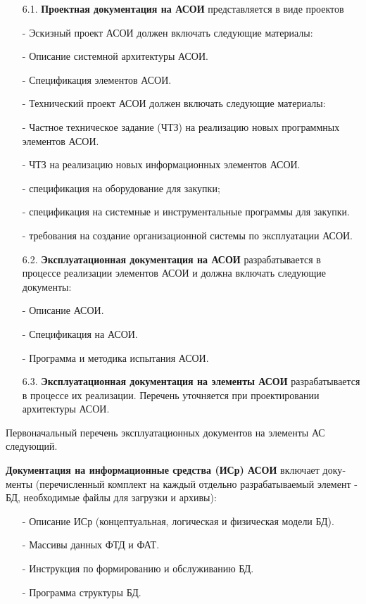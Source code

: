\documentclass[12pt, a4paper, simple]{eskdtext}
\begin{document}
    \begin{enumerate}
        \item[6.1.] \textbf{Проектная документация на АСОИ} представляется в виде проектов
        \item[-] Эскизный проект АСОИ должен включать следующие материалы:
        \item[-] Описание системной архитектуры АСОИ.
        \item[-] Спецификация элементов АСОИ.
        \item[-] Технический проект АСОИ должен включать следующие материалы:
        \item[-] Частное техническое задание (ЧТЗ) на реализацию новых программных элементов АСОИ.
        \item[-] ЧТЗ на реализацию новых информационных элементов АСОИ.
        \item[-] спецификация на оборудование для закупки;
        \item[-] спецификация на системные и инструментальные программы для закупки.
        \item[-] требования на создание организационной системы по эксплуатации АСОИ.
        \item[6.2.] \textbf{Эксплуатационная документация на АСОИ}
        разрабатывается в процессе реализации элемен­тов АСОИ и должна включать следующие документы:
        \item[-] Описание АСОИ.
        \item[-] Спецификация на АСОИ.
        \item[-] Программа и методика испытания АСОИ.
        \item[6.3.] \textbf{Эксплуатационная документация на элементы АСОИ}
        разрабатывается в про­цессе их реали­зации. Перечень уточняется при проектировании архитектуры АСОИ.
    \end{enumerate}

    Первоначальный перечень эксплуатационных документов на элементы АС следующий.

    \textbf{Документация на информационные средства (ИСр) АСОИ} включает доку­менты
    (перечисленный ком­плект на каждый отдельно разрабатываемый элемент - БД, необходимые файлы для загрузки и ар­хивы):
    \begin{enumerate}
        \item[-] Описание ИСр (концептуальная, логическая и физическая модели БД).
        \item[-] Массивы данных ФТД и ФАТ.
        \item[-] Инструкция по формированию и обслуживанию БД.
        \item[-] Программа структуры БД.
    \end{enumerate}
    
\end{document}
